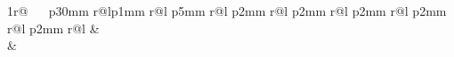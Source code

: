 \begin{table}[!htbp]
\begin{tabularx}{1\textwidth}{{r@{ \ \ } p{30mm} r@{}lp{1mm} r@{}l p{5mm} r@{}l p{2mm} r@{}l p{2mm} r@{}l p{2mm} r@{}l p{2mm} r@{}l p{2mm}   r@{}l  }}
 & \\ 
 & \\
\hline
\end{tabularx}
\end{table}
